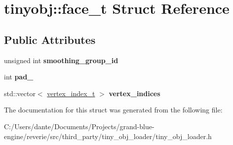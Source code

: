 \hypertarget{structtinyobj_1_1face__t}{}\section{tinyobj\+::face\+\_\+t Struct Reference}
\label{structtinyobj_1_1face__t}
\subsection*{Public Attributes}
\begin{DoxyCompactItemize}
\item 
\mbox{\label{structtinyobj_1_1face__t_ad57f653dac21d8faa8ba3fe9b08006d5}} 
unsigned int {\bfseries smoothing\+\_\+group\+\_\+id}
\item 
\mbox{\label{structtinyobj_1_1face__t_a48d2955faf5e865b0c0286f0b1e7ee11}} 
int {\bfseries pad\+\_\+}
\item 
\mbox{\label{structtinyobj_1_1face__t_aa1ef0c54b69a35bb4c9c1ff698486972}} 
std\+::vector$<$ \mbox{\hyperlink{structtinyobj_1_1vertex__index__t}{vertex\+\_\+index\+\_\+t}} $>$ {\bfseries vertex\+\_\+indices}
\end{DoxyCompactItemize}


The documentation for this struct was generated from the following file\+:\begin{DoxyCompactItemize}
\item 
C\+:/\+Users/dante/\+Documents/\+Projects/grand-\/blue-\/engine/reverie/src/third\+\_\+party/tiny\+\_\+obj\+\_\+loader/tiny\+\_\+obj\+\_\+loader.\+h\end{DoxyCompactItemize}
